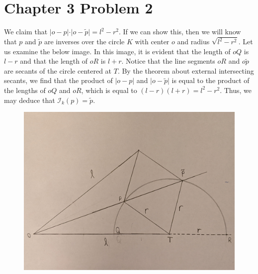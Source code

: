 \documentclass[12pt]{article}
\begin{document}
\section*{Chapter 3 Problem 2}
We claim that $\vert o - p \vert \cdot \vert o - \tilde{p} \vert = l^2 - r^2$. If we can show this, then we will know that $p$ and $\tilde{p}$ are inverses over the circle $K$ with center $o$ and radius $\sqrt{l^2- r^2}$. Let us examine the below image. In this image, it is evident that the length of $oQ$ is $l-r$ and that the length of $oR$ is $l + r$. Notice that the line segments $oR$ and $o\tilde{p}$ are secants of the circle centered at $T$. By the theorem about external intersecting secants, we find that the product of $\vert o - p \vert$ and $\vert o - \tilde{p}\vert$ is equal to the product of the lengths of $oQ$ and $oR$, which is equal to $(l-r)(l+r) = l^2 - r^2$. Thus, we may deduce that $\mathcal{I}_k(p) = \tilde{p}$.
\begin{figure}[H]
\centering
\includegraphics[width=\textwidth]{Problem2Image1}
\end{figure} 
\newpage
\end{document}
